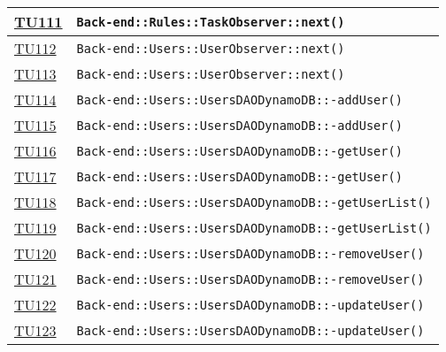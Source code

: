 \begin{longtable}{|>{\centering}m{1cm}|m{12cm}<{\centering}|}
\hyperlink{TU111}{TU111} & \texttt{Back-end::Rules::TaskObserver::next()}\\ \hline

\hyperlink{TU112}{TU112} & \texttt{Back-end::Users::UserObserver::next()}\\ \hline

\hyperlink{TU113}{TU113} & \texttt{Back-end::Users::UserObserver::next()}\\ \hline

\hyperlink{TU114}{TU114} & \texttt{Back-end::Users::UsersDAODynamoDB::-\linebreak addUser()}\\ \hline

\hyperlink{TU115}{TU115} & \texttt{Back-end::Users::UsersDAODynamoDB::-\linebreak addUser()}\\ \hline

\hyperlink{TU116}{TU116} & \texttt{Back-end::Users::UsersDAODynamoDB::-\linebreak getUser()}\\ \hline

\hyperlink{TU117}{TU117} & \texttt{Back-end::Users::UsersDAODynamoDB::-\linebreak getUser()}\\ \hline

\hyperlink{TU118}{TU118} & \texttt{Back-end::Users::UsersDAODynamoDB::-\linebreak getUserList()}\\ \hline

\hyperlink{TU119}{TU119} & \texttt{Back-end::Users::UsersDAODynamoDB::-\linebreak getUserList()}\\ \hline

\hyperlink{TU120}{TU120} & \texttt{Back-end::Users::UsersDAODynamoDB::-\linebreak removeUser()}\\ \hline

\hyperlink{TU121}{TU121} & \texttt{Back-end::Users::UsersDAODynamoDB::-\linebreak removeUser()}\\ \hline

\hyperlink{TU122}{TU122} & \texttt{Back-end::Users::UsersDAODynamoDB::-\linebreak updateUser()}\\ \hline

\hyperlink{TU123}{TU123} & \texttt{Back-end::Users::UsersDAODynamoDB::-\linebreak updateUser()}\\ \hline


\end{longtable}
